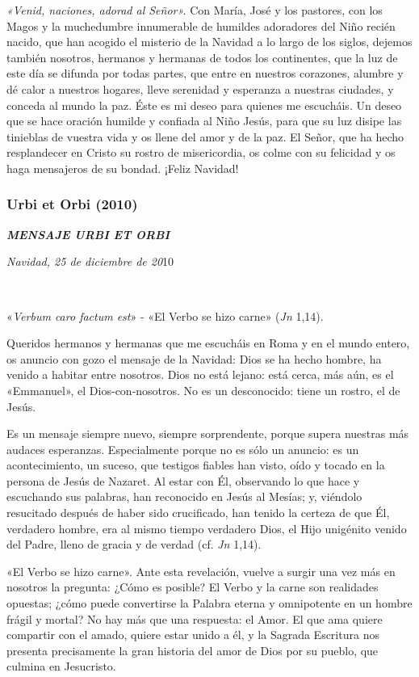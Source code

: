 \emph{«Venid, naciones, adorad al Señor».} Con María, José y los
pastores, con los Magos y la muchedumbre innumerable de humildes
adoradores del Niño recién nacido, que han acogido el misterio de la
Navidad a lo largo de los siglos, dejemos también nosotros, hermanos y
hermanas de todos los continentes, que la luz de este día se difunda por
todas partes, que entre en nuestros corazones, alumbre y dé calor a
nuestros hogares, lleve serenidad y esperanza a nuestras ciudades, y
conceda al mundo la paz. Éste es mi deseo para quienes me escucháis. Un
deseo que se hace oración humilde y confiada al Niño Jesús, para que su
luz disipe las tinieblas de vuestra vida y os llene del amor y de la
paz. El Señor, que ha hecho resplandecer en Cristo su rostro de
misericordia, os colme con su felicidad y os haga mensajeros de su
bondad. ¡Feliz Navidad!

\subsubsection{Urbi et Orbi (2010)}
\textbf{\emph{MENSAJE URBI ET ORBI}}

\emph{Navidad, 25 de diciembre de 20}10

~

«\emph{Verbum caro factum est}» - «El Verbo se hizo carne» (\emph{Jn}
1,14).

Queridos hermanos y hermanas que me escucháis en Roma y en el mundo
entero, os anuncio con gozo el mensaje de la Navidad: Dios se ha hecho
hombre, ha venido a habitar entre nosotros. Dios no está lejano: está
cerca, más aún, es el «Emmanuel», el Dios-con-nosotros. No es un
desconocido: tiene un rostro, el de Jesús.

Es un mensaje siempre nuevo, siempre sorprendente, porque supera
nuestras más audaces esperanzas. Especialmente porque no es sólo un
anuncio: es un acontecimiento, un suceso, que testigos fiables han
visto, oído y tocado en la persona de Jesús de Nazaret. Al estar con Él,
observando lo que hace y escuchando sus palabras, han reconocido en
Jesús al Mesías; y, viéndolo resucitado después de haber sido
crucificado, han tenido la certeza de que Él, verdadero hombre, era al
mismo tiempo verdadero Dios, el Hijo unigénito venido del Padre, lleno
de gracia y de verdad (cf. \emph{Jn} 1,14).

«El Verbo se hizo carne». Ante esta revelación, vuelve a surgir una vez
más en nosotros la pregunta: ¿Cómo es posible? El Verbo y la carne son
realidades opuestas; ¿cómo puede convertirse la Palabra eterna y
omnipotente en un hombre frágil y mortal? No hay más que una respuesta:
el Amor. El que ama quiere compartir con el amado, quiere estar unido a
él, y la Sagrada Escritura nos presenta precisamente la gran historia
del amor de Dios por su pueblo, que culmina en Jesucristo.

